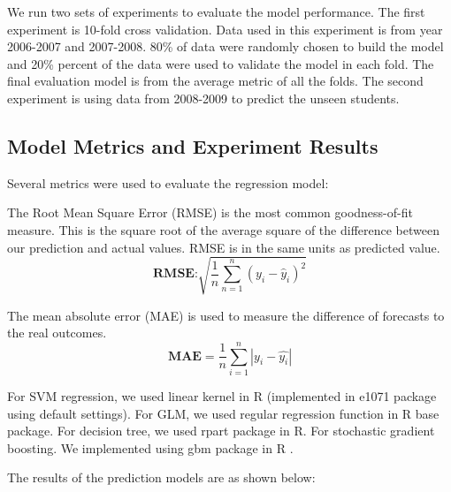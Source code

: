 \documentclass[12pt,english]{report}
\begin{document}
    
We run two sets of experiments to evaluate the model performance. The first
experiment is 10-fold cross validation. Data used in this experiment is from
year 2006-2007 and 2007-2008. 
80\% of data were randomly chosen to build the model and 20\% percent of the
data were used to validate the model in each fold.
The final evaluation model is from the average metric of all the folds.
The second experiment is using data from 2008-2009 to predict the unseen
students.
    
\subsection{Model Metrics and Experiment Results}
Several metrics were used to evaluate the regression model:

The Root Mean Square Error (RMSE) is the most common goodness-of-fit measure.
This is the square root of the average square of the difference between our
prediction and actual values. RMSE is in the same units as predicted value.
\begin{equation}
\textbf{RMSE:}  \sqrt{\frac{1}{n}\sum_{n=1}^n (y_i-\hat{y}_i)^2}
\end{equation}

The mean absolute error (MAE) is used to measure the difference of forecasts to
the real outcomes.
\begin{equation}
\textbf{MAE} = \frac{1}{n}\sum_{i=1}^n \left| y_i - \hat{y_i}\right| 
\end{equation}



For SVM regression, we used linear kernel in R (implemented in e1071 package
\citep{e1071} using default settings). For GLM, we used regular regression
function in R base package. For decision tree, we used rpart package
\citep{rpart} in R. For stochastic gradient boosting. We implemented using
gbm package in R \citep{gbm}.
 
The results of the prediction models are as shown below:
\end{document}
